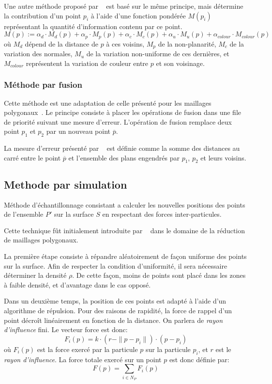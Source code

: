 Une autre méthode proposé par \citeauthor{Linsen2001}~\cite{Linsen2001} est basé sur le même principe, mais détermine la contribution d'un point $p_i$ à l'aide d'une fonction pondérée $M(p_i)$ représentant la quantité d'information contenu par ce point.
$$M(p) := \alpha_d \cdot M_d(p)+\alpha_p \cdot M_p(p)+\alpha_c \cdot M_c(p)+\alpha_u \cdot M_u(p)+\alpha_{colour} \cdot M_{colour}(p)$$
où $M_d$ dépend de la distance de $p$ à ces voisins, $M_p$ de la non-planarité, $M_c$ de la variation des normales, $M_u$ de la variation non-uniforme de ces dernières, et $M_{colour}$ représentent la variation de couleur entre $p$ et son voisinage.

\subsubsection{Méthode par fusion}
Cette méthode est une adaptation de celle présenté pour les maillages polygonaux~\cite{Hoppe1996}. Le principe consiste à placer les opérations de fusion dans une file de priorité suivant une mesure d'erreur. L'opération de fusion remplace deux point $p_1$ et $p_2$ par un nouveau point $\overline{p}$.

La mesure d'erreur présenté par \citeauthor{Pauly2002}~\cite{Pauly2002} est définie comme la somme des distances au carré entre le point $\overline{p}$ et l'ensemble des plans engendrés par $p_1$, $p_2$ et leurs voisins.

\subsection{Methode par simulation}
\begin{definition}
  Méthode d'échantillonnage consistant a calculer les nouvelles positions des points de l'ensemble $P'$ sur la surface $S$ en respectant des forces inter-particules.
\end{definition}

Cette technique fût initialement introduite par \citeauthor{Turk1992}~\cite{Turk1992} dans le domaine de la réduction de maillages polygonaux.

La première étape consiste à répandre aléatoirement de façon uniforme des points sur la surface. Afin de respecter la condition d'uniformité, il sera nécessaire déterminer la densité $\rho$. De cette façon, moins de points sont placé dans les zones à faible densité, et d'avantage dans le cas opposé.

Dans un deuxième temps, la position de ces points est adapté à l'aide d'un algorithme de répulsion. Pour des raisons de rapidité, la force de rappel d'un point décroît linéairement en fonction de la distance. On parlera de \emph{rayon d'influence} fini. Le vecteur force est donc:
$$F_i(p)=k\cdot(r-\|p-p_i\|)\cdot(p-p_i)$$
où $F_i(p)$ est la force exercé par la particule $p$ sur la particule $p_i$, et $r$ est le \emph{rayon d'influence}.
La force totale exercé sur un point $p$ est donc définie par:
$$F(p)=\sum\limits_{i\in N_P}F_i(p)$$

